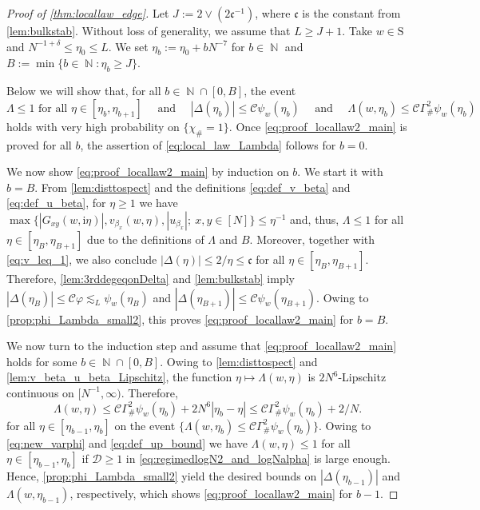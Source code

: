 \documentclass[10pt,a4paper]{amsart}
\DeclareMathOperator{\NN}{\mathbb{N}}
\newcommand{\ii}{\mathrm{i}}
\newcommand{\abs}[1]{\left| #1 \right|}
\newcommand{\ccc}{\mathfrak{c}}
\numberwithin{equation}{section}
\begin{document}
	
	\begin{proof}[Proof of \cref{thm:locallaw_edge}]
		Let $J:=2\vee (2 \ccc^{-1})$, where $\ccc$ is the constant from \cref{lem:bulkstab}.
		Without loss of generality, we assume that $L \geq J  +1$.  
		Take $w \in \mathrm{S}$ and $N^{-1+ \delta} \le \eta_0 \le L $. 
		We set $\eta_b:= \eta_0 + bN^{-7} $ for $b \in \NN$ and $B:= \min\{ b\in \NN: \eta_b \ge  J \}$. 
		
		
		Below we will show that, for all $b \in \NN \cap [0,B]$, the event 
		\begin{equation} \label{eq:proof_locallaw2_main} 
			 \Lambda \leq 1 \text{ for all } \eta \in [\eta_b,\eta_{b+1}] \quad \text{ and } \quad 
			\abs{\Delta(\eta_b)} \leq \mathcal C \psi_w(\eta_b) \quad \text{ and } \quad
			\Lambda(w,\eta_b) \leq \mathcal C \Gamma_{\#}^2 \psi_w(\eta_b) 
		\end{equation} 
		holds 
		with very high probability on $\{ \chi_{\#} = 1\}$. 
		Once \eqref{eq:proof_locallaw2_main} is proved for all $b$, the assertion of \cref{eq:local_law_Lambda} follows for $b=0$. 
		
		We now show \eqref{eq:proof_locallaw2_main} by induction on $b$. We start it with $b = B$. 
		From \cref{lem:disttospect} and the definitions \eqref{eq:def_v_beta} and \eqref{eq:def_u_beta}, for $\eta \ge 1$ we have $ \max\{\abs{G_{xy}(w, \ii \eta)}, v_{\beta_x}(w,\eta),\abs{u_{\beta_x}} ; ~x,y \in [N]\}\leq \eta^{-1}$ and, thus, $ \Lambda \leq 1$ for all $\eta \in [\eta_B,\eta_{B+1}]$ due to the definitions of $\Lambda$ and $B$.
		Moreover, together with \eqref{eq:v_leq_1}, we also conclude $\abs{\Delta(\eta)} \leq 2/\eta \leq \ccc$ for all $\eta \in [\eta_B,\eta_{B+1}]$. Therefore, 
		\cref{lem:3rddegeqonDelta} and \cref{lem:bulkstab} imply $\abs{\Delta(\eta_{B}) }\le \mathcal C \varphi \lesssim_L \psi_w(\eta_B)$ and $\abs{\Delta(\eta_{B+1})}\leq \mathcal C \psi_w(\eta_{B+1})$. Owing to \cref{prop:phi_Lambda_small2}, this proves \eqref{eq:proof_locallaw2_main} for $b =B$. 
		
		
		We now turn to the induction step and assume that \eqref{eq:proof_locallaw2_main} holds for some $b \in \NN\cap [0,B]$. Owing to \cref{lem:disttospect} and \cref{lem:v_beta_u_beta_Lipschitz}, the function $\eta \mapsto \Lambda(w,\eta)$ 
		is $ 2  N^6$-Lipschitz continuous on $[N^{-1},\infty)$. Therefore, 
		\begin{equation} \label{eq:Lambda_small_Lipschitz_2} 
			\Lambda(w,\eta) \le \mathcal{C}\Gamma_{\#}^2\psi_w(\eta_{b}) +  2  N^6 \abs{\eta_{b} - \eta} \le \mathcal{C}\Gamma_{\#}^2\psi_w(\eta_{b}) + 2/N.
		\end{equation}
		for all $\eta \in [\eta_{b-1},\eta_{b}]$ on the event $\{ \Lambda(w,\eta_b) \leq \mathcal C \Gamma_{\#}^2\psi_w(\eta_{b}) \}$. Owing to \eqref{eq:new_varphi} and \eqref{eq:def_up_bound} we have $\Lambda(w,\eta) \leq 1$ for all $\eta \in [\eta_{b-1},\eta_{b}]$ if $\mathcal{D}\geq 1$ in \eqref{eq:regimedlogN2_and_logNalpha} is large enough. Hence, \cref{prop:phi_Lambda_small2} yield the desired bounds on $\abs{\Delta(\eta_{b-1})}$ and $\Lambda(w,\eta_{b-1})$, respectively, which shows \eqref{eq:proof_locallaw2_main} for $b-1$. 
		

\end{proof}
\end{document}
